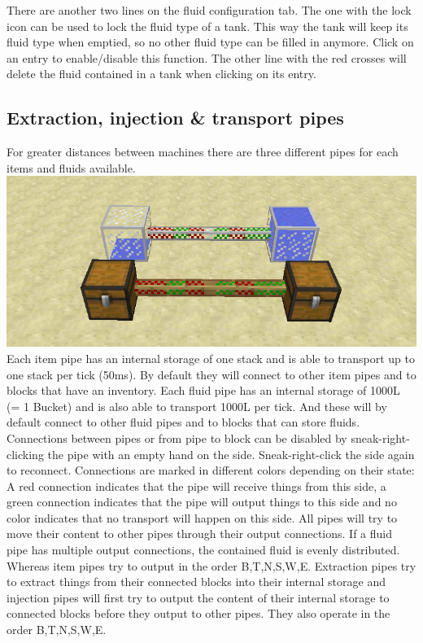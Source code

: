 \documentclass[11pt]{article} %
\begin{document}
There are another two lines on the fluid configuration tab. The one with the lock icon can be used to lock the fluid type of a tank. This way the tank will keep its fluid type when emptied, so no other fluid type can be filled in anymore. Click on an entry to enable/disable this function. The other line with the red crosses will delete the fluid contained in a tank when clicking on its entry.

\subsection{Extraction, injection \& transport pipes}
For greater distances between machines there are three different pipes for each items and fluids available.\\
\includegraphics[width = \textwidth]{pipes}
Each item pipe has an internal storage of one stack and is able to transport up to one stack per tick (50ms). By default they will connect to other item pipes and to blocks that have an inventory. Each fluid pipe has an internal storage of 1000L (= 1 Bucket) and is also able to transport 1000L per tick. And these will by default connect to other fluid pipes and to blocks that can store fluids. Connections between pipes or from pipe to block can be disabled by sneak-right-clicking the pipe with an empty hand on the side. Sneak-right-click the side again to reconnect. Connections are marked in different colors depending on their state: A red connection indicates that the pipe will receive things from this side, a green connection indicates that the pipe will output things to this side and no color indicates that no transport will happen on this side. All pipes will try to move their content to other pipes through their output connections. If a fluid pipe has multiple output connections, the contained fluid is evenly distributed. Whereas item pipes try to output in the order B,T,N,S,W,E. Extraction pipes try to extract things from their connected blocks into their internal storage and injection pipes will first try to output the content of their internal storage to connected blocks before they output to other pipes. They also operate in the order B,T,N,S,W,E. \\
\end{document}
